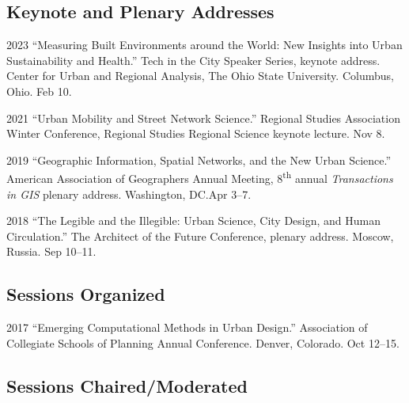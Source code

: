 \documentclass[11pt,letterpaper]{report}
\begin{document}
    \subsection*{Keynote and Plenary Addresses}

    \begin{tablist}

        \item[2023] \tab{}\enquote{Measuring Built Environments around the World: New Insights into Urban Sustainability and Health.} Tech in the City Speaker Series, keynote address. Center for Urban and Regional Analysis, The Ohio State University. Columbus, Ohio. Feb 10.

        \item[2021] \tab{}\enquote{Urban Mobility and Street Network Science.} Regional Studies Association Winter Conference, Regional Studies Regional Science keynote lecture. Nov 8.

        \item[2019] \tab{}\enquote{Geographic Information, Spatial Networks, and the New Urban Science.} American Association of Geographers Annual Meeting, 8\textsuperscript{th} annual \textit{Transactions in GIS} plenary address. Washington, DC.\@ Apr 3--7.

        \item[2018] \tab{}\enquote{The Legible and the Illegible: Urban Science, City Design, and Human Circulation.} The Architect of the Future Conference, plenary address. Moscow, Russia. Sep 10--11.

    \end{tablist}

    \subsection*{Sessions Organized}

    \begin{tablist}

        \item[2017] \tab{}\enquote{Emerging Computational Methods in Urban Design.} Association of Collegiate Schools of Planning Annual Conference. Denver, Colorado. Oct 12--15.

    \end{tablist}

    \subsection*{Sessions Chaired/Moderated}
\end{document}
